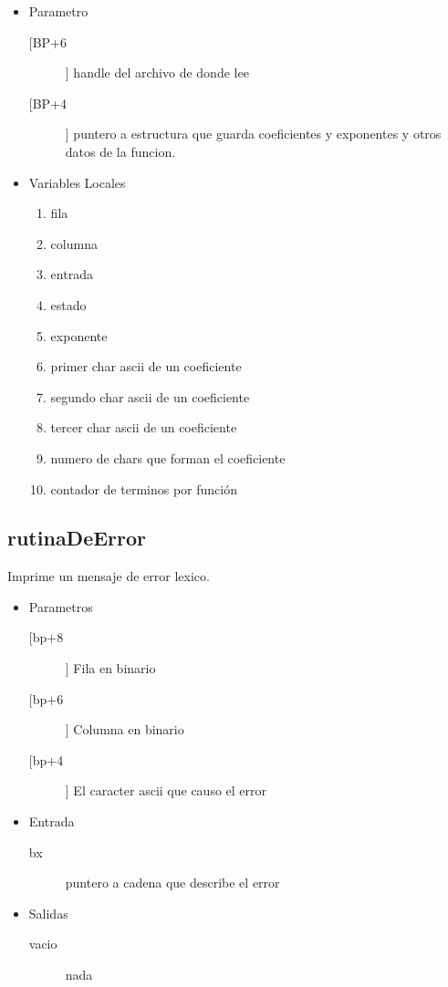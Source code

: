 \begin{itemize}
\item Parametro
\begin{description}
\item[[BP+6]] handle del archivo de donde lee
\item[[BP+4]] puntero a estructura que guarda coeficientes y
exponentes y otros datos de la funcion.
\end{description}
\item Variables Locales
\begin{enumerate}
\item\relax [BP-2]  fila
\item\relax [BP-4]  columna
\item\relax [BP-6]  entrada
\item\relax [BP-8]  estado
\item\relax [BP-0xA]  exponente
\item\relax [BP-0xC]  primer char ascii de un coeficiente
\item\relax [BP-0xE]  segundo char ascii de un coeficiente
\item\relax [BP-0x10]  tercer char ascii de un coeficiente
\item\relax [BP-0x12]  numero de chars que forman el coeficiente
\item\relax [BP-0x14] contador de terminos por función
\end{enumerate}
\end{itemize}

\subsection{rutinaDeError}
\label{sec-2-3}
Imprime un mensaje de error lexico.
\begin{itemize}
\item Parametros
\begin{description}
\item[[bp+8]] Fila en binario
\item[[bp+6]] Columna en binario
\item[[bp+4]] El caracter ascii que causo el error
\end{description}
\item Entrada
\begin{description}
\item[bx] puntero a cadena que describe el error
\end{description}
\item Salidas
\begin{description}
\item[vacio] nada
\end{description}
\end{itemize}

